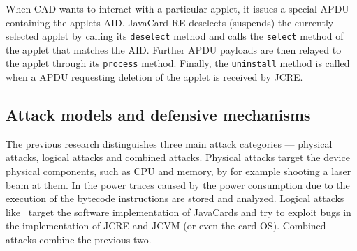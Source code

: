 \documentclass{../llncs/llncs}
\begin{document}
When CAD wants to interact with a particular applet, it issues a special APDU containing the applets AID. JavaCard RE deselects (suspends) the currently selected applet by calling its \texttt{deselect} method and calls the \texttt{select} method of the applet that matches the AID. Further APDU payloads are then relayed to the applet through its \texttt{process} method. Finally, the \texttt{uninstall} method is called when a APDU requesting deletion of the applet is received by JCRE.


    \subsection{Attack models and defensive mechanisms}
    The previous research distinguishes three main attack categories --- physical attacks, logical attacks and combined attacks. Physical attacks target the device physical components, such as CPU and memory, by for example shooting a laser beam at them. In \cite{Prpic2010thesis} the power traces caused by the power consumption due to the execution of the bytecode instructions are stored and analyzed.
    Logical attacks like~\cite{hogenboom} target the software implementation of JavaCards and try to exploit bugs in the implementation of JCRE and JCVM (or even the card OS). Combined attacks combine the previous two.

\end{document}
